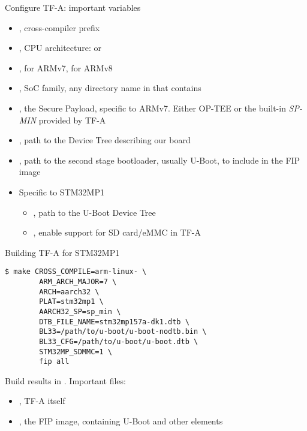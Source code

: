 \begin{frame}{Configure TF-A: important variables}
  \begin{itemize}
  \item {}, cross-compiler prefix
  \item {}, CPU architecture:  or 
  \item {},  for ARMv7,  for ARMv8
  \item {}, SoC family, any directory name in 
    that contains 
  \item {}, the Secure Payload, specific to
    ARMv7. Either OP-TEE or the built-in {\em SP-MIN} provided by TF-A
  \item {}, path to the Device Tree describing our board
  \item {}, path to the second stage bootloader, usually
    U-Boot, to include in the FIP image
  \item Specific to STM32MP1
    \begin{itemize}
    \item {}, path to the U-Boot Device Tree
    \item {}, enable support for SD card/eMMC in TF-A
    \end{itemize}
  \end{itemize}
\end{frame}

\begin{frame}[fragile]{Building TF-A for STM32MP1}
  \begin{block}{}
    {\tiny
\begin{verbatim}
$ make CROSS_COMPILE=arm-linux- \
        ARM_ARCH_MAJOR=7 \
        ARCH=aarch32 \
        PLAT=stm32mp1 \
        AARCH32_SP=sp_min \
        DTB_FILE_NAME=stm32mp157a-dk1.dtb \
        BL33=/path/to/u-boot/u-boot-nodtb.bin \
        BL33_CFG=/path/to/u-boot/u-boot.dtb \
        STM32MP_SDMMC=1 \
        fip all
\end{verbatim}
    }
  \end{block}

  Build results in . Important files:

  \begin{itemize}
  \item {}, TF-A itself
  \item {}, the FIP image, containing U-Boot and other
    elements
  \end{itemize}
\end{frame}

